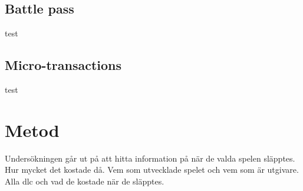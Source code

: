 \documentclass[11p]{article}
\begin{document}
\begin{otherlanguage}{swedish}
    \subsection{Battle pass}
    test
    \subsection{Micro-transactions}
    test
\section{Metod}

     Undersökningen går ut på att hitta information på när de valda spelen släpptes.
     Hur mycket det kostade då. %
     Vem som utvecklade spelet och vem som är utgivare.
     Alla dlc och vad de kostade när de släpptes.

    \printbibliography

    \end{otherlanguage}
\end{document}

